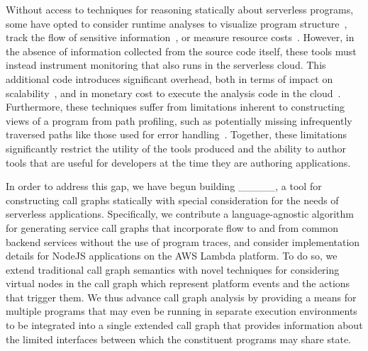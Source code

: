 Without access to techniques for reasoning statically about serverless programs, some have opted to consider runtime analyses to visualize program structure~\cite{lowgo,causalorder}, track the flow of sensitive information~\cite{ifc}, or measure resource costs~\cite{curtain}. However, in the absence of information collected from the source code itself, these tools must instead instrument monitoring that also runs in the serverless cloud. This additional code introduces significant overhead, both in terms of impact on scalability~\cite{SOMETHING}, and in monetary cost to execute the analysis code in the cloud~\cite{serverlesscost}. Furthermore, these techniques suffer from limitations inherent to constructing views of a program from path profiling, such as potentially missing infrequently traversed paths like those used for error handling~\cite{SOMETHING}. Together, these limitations significantly restrict the utility of the tools produced and the ability to author tools that are useful for developers at the time they are authoring applications. \par
In order to address this gap, we have begun building \_\_\_\_\_, a tool for constructing call graphs statically with special consideration for the needs of serverless applications. Specifically, we contribute a language-agnostic algorithm for generating service call graphs that incorporate flow to and from common backend services without the use of program traces, and consider implementation details for NodeJS applications on the AWS Lambda platform. To do so, we extend traditional call graph semantics with novel techniques for considering virtual nodes in the call graph which represent platform events and the actions that trigger them. We thus advance call graph analysis by providing a means for multiple programs that may even be running in separate execution environments to be integrated into a single extended call graph that provides information about the limited interfaces between which the constituent programs may share state. \par





